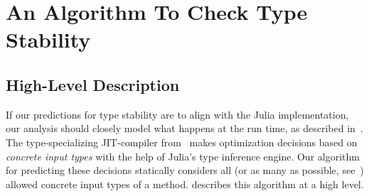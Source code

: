 \section{An Algorithm To Check Type Stability}%
\label{sec:algo}

\subsection{High-Level Description}
\label{ssec:algo:high}

If our predictions for type stability are to align with the Julia
implementation, our analysis should closely model what happens at the run time,
as described in~. The type-specializing JIT-compiler
from~ makes optimization decisions based on \emph{concrete
  input types} with the help of Julia's type inference engine. Our algorithm for
predicting these decisions statically considers all (or as many as possible,
see~) allowed concrete input types of a method.
 describes this algorithm at a high level.



